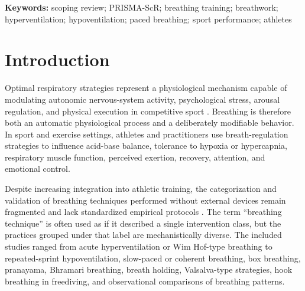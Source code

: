 \documentclass[11pt,a4paper]{article}
\begin{document}
\begin{center}
\end{center}

\noindent\textbf{Keywords:} scoping review; PRISMA-ScR; breathing training; breathwork; hyperventilation; hypoventilation; paced breathing; sport performance; athletes

\section{Introduction}
Optimal respiratory strategies represent a physiological mechanism capable of modulating autonomic nervous-system activity, psychological stress, arousal regulation, and physical execution in competitive sport \parencite{sports11050103}. Breathing is therefore both an automatic physiological process and a deliberately modifiable behavior. In sport and exercise settings, athletes and practitioners use breath-regulation strategies to influence acid-base balance, tolerance to hypoxia or hypercapnia, respiratory muscle function, perceived exertion, recovery, attention, and emotional control.

Despite increasing integration into athletic training, the categorization and validation of breathing techniques performed without external devices remain fragmented and lack standardized empirical protocols \parencite{Laborde31122024}. The term ``breathing technique'' is often used as if it described a single intervention class, but the practices grouped under that label are mechanistically diverse. The included studies ranged from acute hyperventilation or Wim Hof-type breathing to repeated-sprint hypoventilation, slow-paced or coherent breathing, box breathing, pranayama, Bhramari breathing, breath holding, Valsalva-type strategies, hook breathing in freediving, and observational comparisons of breathing patterns.
\end{document}
